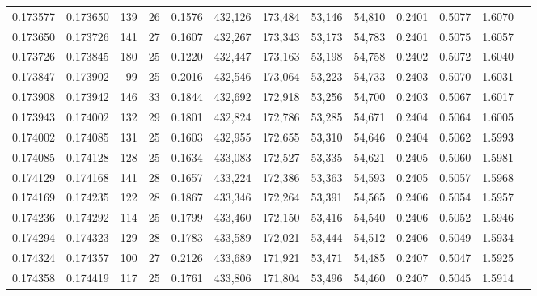 \begin{tabular}{rrrrrrrrrrrrr}
0.173577 & 0.173650 & 139 &  26 &                                     0.1576 & 432,126 & 173,484 &  53,146 &  54,810 & 0.2401 & 0.5077 & 1.6070 \\
0.173650 & 0.173726 & 141 &  27 &                                     0.1607 & 432,267 & 173,343 &  53,173 &  54,783 & 0.2401 & 0.5075 & 1.6057 \\
0.173726 & 0.173845 & 180 &  25 &                                     0.1220 & 432,447 & 173,163 &  53,198 &  54,758 & 0.2402 & 0.5072 & 1.6040 \\
0.173847 & 0.173902 &  99 &  25 &                                     0.2016 & 432,546 & 173,064 &  53,223 &  54,733 & 0.2403 & 0.5070 & 1.6031 \\
0.173908 & 0.173942 & 146 &  33 &                                     0.1844 & 432,692 & 172,918 &  53,256 &  54,700 & 0.2403 & 0.5067 & 1.6017 \\
0.173943 & 0.174002 & 132 &  29 &                                     0.1801 & 432,824 & 172,786 &  53,285 &  54,671 & 0.2404 & 0.5064 & 1.6005 \\
0.174002 & 0.174085 & 131 &  25 &                                     0.1603 & 432,955 & 172,655 &  53,310 &  54,646 & 0.2404 & 0.5062 & 1.5993 \\
0.174085 & 0.174128 & 128 &  25 &                                     0.1634 & 433,083 & 172,527 &  53,335 &  54,621 & 0.2405 & 0.5060 & 1.5981 \\
0.174129 & 0.174168 & 141 &  28 &                                     0.1657 & 433,224 & 172,386 &  53,363 &  54,593 & 0.2405 & 0.5057 & 1.5968 \\
0.174169 & 0.174235 & 122 &  28 &                                     0.1867 & 433,346 & 172,264 &  53,391 &  54,565 & 0.2406 & 0.5054 & 1.5957 \\
0.174236 & 0.174292 & 114 &  25 &                                     0.1799 & 433,460 & 172,150 &  53,416 &  54,540 & 0.2406 & 0.5052 & 1.5946 \\
0.174294 & 0.174323 & 129 &  28 &                                     0.1783 & 433,589 & 172,021 &  53,444 &  54,512 & 0.2406 & 0.5049 & 1.5934 \\
0.174324 & 0.174357 & 100 &  27 &                                     0.2126 & 433,689 & 171,921 &  53,471 &  54,485 & 0.2407 & 0.5047 & 1.5925 \\
0.174358 & 0.174419 & 117 &  25 &                                     0.1761 & 433,806 & 171,804 &  53,496 &  54,460 & 0.2407 & 0.5045 & 1.5914 \\

\end{tabular}
